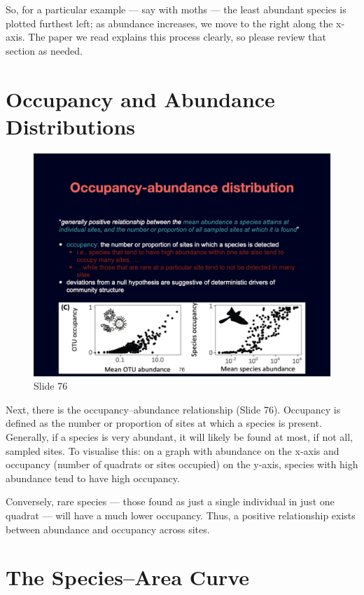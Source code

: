 \documentclass[
  10pt,
]{book}
\begin{document}
So, for a particular example --- say with moths --- the least abundant
species is plotted furthest left; as abundance increases, we move to the
right along the x-axis. The paper we read explains this process clearly,
so please review that section as needed.

\section{Occupancy and Abundance
Distributions}\label{occupancy-and-abundance-distributions}

\begin{figure}[ht]
\centering
\includegraphics[width=0.8\linewidth]{../images/BDC334/BDC334-076.jpeg}
\caption*{Slide 76}
\end{figure}

Next, there is the occupancy--abundance relationship (Slide 76).
Occupancy is defined as the number or proportion of sites at which a
species is present. Generally, if a species is very abundant, it will
likely be found at most, if not all, sampled sites. To visualise this:
on a graph with abundance on the x-axis and occupancy (number of
quadrats or sites occupied) on the y-axis, species with high abundance
tend to have high occupancy.

Conversely, rare species --- those found as just a single individual in
just one quadrat --- will have a much lower occupancy. Thus, a positive
relationship exists between abundance and occupancy across sites.

\section{The Species--Area Curve}\label{the-speciesarea-curve}
\end{document}
